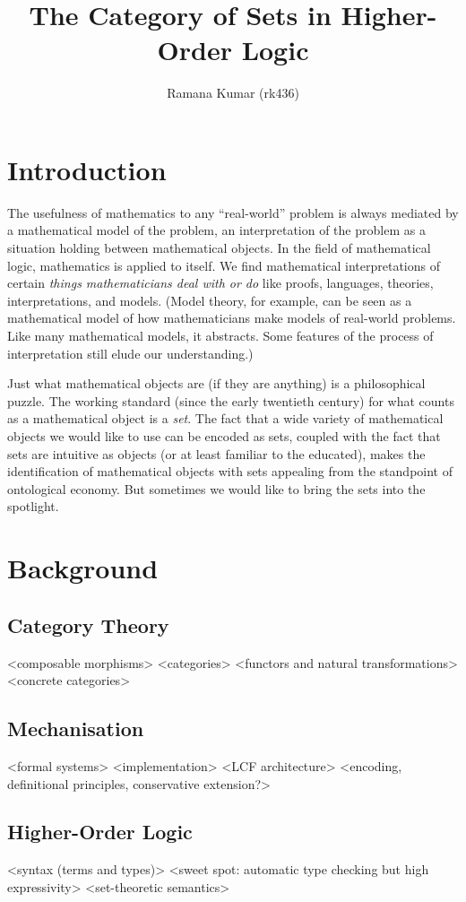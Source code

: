 \documentclass{article}
\title{The Category of Sets in Higher-Order Logic}
\author{Ramana Kumar (rk436)}
\begin{document}
\maketitle
\section{Introduction}
The usefulness of mathematics to any ``real-world'' problem is always mediated by a mathematical model of the problem, an interpretation of the problem as a situation holding between mathematical objects. 
In the field of mathematical logic, mathematics is applied to itself.
We find mathematical interpretations of certain \emph{things mathematicians deal with or do} like proofs, languages, theories, interpretations, and models.
(Model theory, for example, can be seen as a mathematical model of how mathematicians make models of real-world problems. 
Like many mathematical models, it abstracts.
Some features of the process of interpretation still elude our understanding.)

Just what mathematical objects are (if they are anything) is a philosophical puzzle.
The working standard (since the early twentieth century) for what counts as a mathematical object is a \emph{set}.
The fact that a wide variety of mathematical objects we would like to use can be encoded as sets, coupled with the fact that sets are intuitive as objects (or at least familiar to the educated), makes the identification of mathematical objects with sets appealing from the standpoint of ontological economy.
But sometimes we would like to bring the sets into the spotlight.
\section{Background}
\subsection{Category Theory}
<composable morphisms>
<categories>
<functors and natural transformations>
<concrete categories>
\subsection{Mechanisation}
<formal systems>
<implementation>
<LCF architecture>
<encoding, definitional principles, conservative extension?>
\subsection{Higher-Order Logic}
<syntax (terms and types)>
<sweet spot: automatic type checking but high expressivity>
<set-theoretic semantics>
\end{document}
